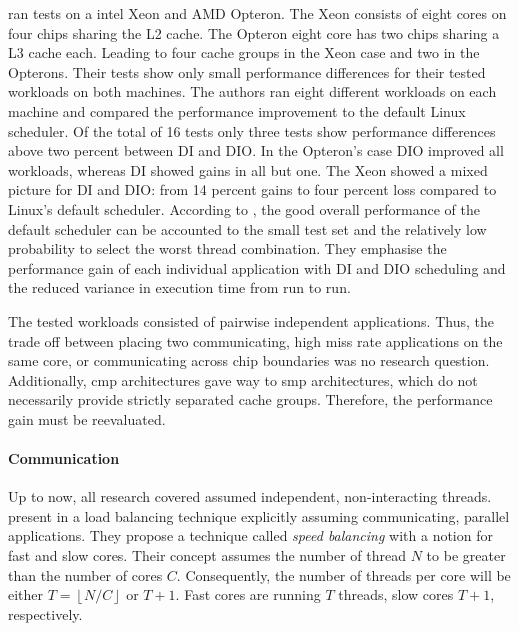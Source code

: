 \citeauthor{zhuravlev_addressing_2010} ran tests on a \gls{intel}
Xeon and AMD Opteron.
The Xeon consists of eight cores on four chips sharing the L2 cache.
The Opteron eight core has two chips sharing a L3 cache each.
Leading to four cache groups in the Xeon case and two in the Opterons.
Their tests show only small performance differences for their tested workloads
on both machines.
The authors ran eight different workloads on each machine and compared the
performance improvement to the default Linux scheduler.
Of the total of 16 tests only three tests show performance differences above
two percent between DI and DIO.
In the Opteron's case DIO improved all workloads, whereas DI showed gains in
all but one.
The Xeon showed a mixed picture for DI and DIO: from 14 percent gains to four
percent loss compared to Linux's default scheduler.
According to \citeauthor{zhuravlev_addressing_2010}, the good overall
performance of the default scheduler can be accounted to the small test set and
the relatively low probability to select the worst thread combination.
They emphasise the performance gain of each individual application with DI and
DIO scheduling and the reduced variance in execution time from run to run.

The tested workloads consisted of pairwise independent applications.
Thus, the trade off between placing two communicating, high miss rate
applications on the same core, or communicating across chip boundaries was no
research question.
Additionally, \gls{cmp} architectures gave way to \gls{smp} architectures,
which do not necessarily provide strictly separated cache groups.
Therefore, the performance gain must be reevaluated.
\\

\paragraph{Communication}
Up to now, all research covered assumed independent, non-interacting threads.
\citeauthor{hofmeyr_load_2010} present in \cite{hofmeyr_load_2010} a load
balancing technique explicitly assuming communicating, parallel applications.
They propose a technique called \emph{speed balancing} with a notion for fast
and slow cores.
Their concept assumes the number of thread $N$ to be greater than the number of
cores $C$.
Consequently, the number of threads per core will be either
$T = \left \lfloor{N/C}\right \rfloor$ or $T+1$.
Fast cores are running $T$ threads, slow cores $T+1$, respectively.


